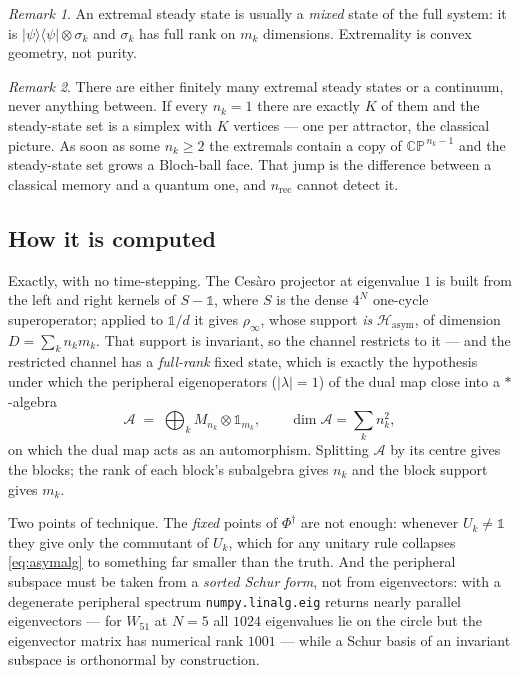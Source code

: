 \documentclass[11pt]{article}
\newcommand{\rt}[1]{\texttt{#1}}
\newcommand{\Phid}{\Phi^{\dagger}}
\theoremstyle{plain}
\theoremstyle{definition}
\theoremstyle{remark}
\newtheorem{remark}{Remark}
\begin{document}
\begin{remark}
An extremal steady state is usually a \emph{mixed} state of the full system:
it is $|\psi\rangle\langle\psi|\otimes\sigma_k$ and $\sigma_k$ has full rank on
$m_k$ dimensions. Extremality is convex geometry, not purity.
\end{remark}

\begin{remark}
There are either finitely many extremal steady states or a continuum, never
anything between. If every $n_k = 1$ there are exactly $K$ of them and the
steady-state set is a simplex with $K$ vertices --- one per attractor, the
classical picture. As soon as some $n_k \ge 2$ the extremals contain a copy of
$\mathbb{CP}^{\,n_k-1}$ and the steady-state set grows a Bloch-ball face. That
jump is the difference between a classical memory and a quantum one, and
$n_{\mathrm{rec}}$ cannot detect it.
\end{remark}

\subsection{How it is computed}

Exactly, with no time-stepping. The Ces\`aro projector at eigenvalue $1$ is
built from the left and right kernels of $S - \mathbb{1}$, where $S$ is the
dense $4^N$ one-cycle superoperator; applied to $\mathbb{1}/d$ it gives
$\rho_\infty$, whose support \emph{is} $\mathcal{H}_{\mathrm{asym}}$, of
dimension $D = \sum_k n_k m_k$. That support is invariant, so the channel
restricts to it --- and the restricted channel has a \emph{full-rank} fixed
state, which is exactly the hypothesis under which the peripheral
eigenoperators ($|\lambda| = 1$) of the dual map close into a $*$-algebra
\begin{equation}
  \mathcal{A} \;=\; \bigoplus_k M_{n_k} \otimes \mathbb{1}_{m_k},
  \qquad \dim\mathcal{A} = \sum_k n_k^2 ,
  \label{eq:asymalg}
\end{equation}
on which the dual map acts as an automorphism. Splitting $\mathcal{A}$ by its
centre gives the blocks; the rank of each block's subalgebra gives $n_k$ and
the block support gives $m_k$.

Two points of technique. The \emph{fixed} points of $\Phid$ are not enough:
whenever $U_k \ne \mathbb{1}$ they give only the commutant of $U_k$, which for
any unitary rule collapses \eqref{eq:asymalg} to something far smaller than the
truth. And the peripheral subspace must be taken from a \emph{sorted Schur
form}, not from eigenvectors: with a degenerate peripheral spectrum
\rt{numpy.linalg.eig} returns nearly parallel eigenvectors --- for $W_{51}$ at
$N=5$ all $1024$ eigenvalues lie on the circle but the eigenvector matrix has
numerical rank $1001$ --- while a Schur basis of an invariant subspace is
orthonormal by construction.
\end{document}
